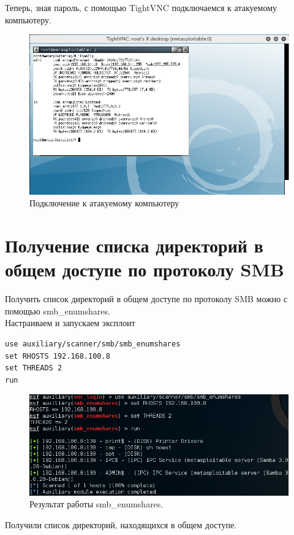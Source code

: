 \documentclass[10pt,a4paper]{report}
\begin{document}
Теперь, зная пароль, с помощью TightVNC подключаемся к атакуемому компьютеру.
\begin{figure}[h!]
	\centering
	\includegraphics[width=\textwidth]{Img/7}
	\caption{Подключение к атакуемому компьютеру}
	\label{Img:7}
\end{figure}

\newpage
\section{Получение списка директорий в общем доступе по протоколу SMB}
Получить список директорий в общем доступе по протоколу SMB можно с помощью smb\_enumshares.\\
Настраиваем и запускаем эксплоит
\begin{verbatim}
use auxiliary/scanner/smb/smb_enumshares
set RHOSTS 192.168.100.8
set THREADS 2
run
\end{verbatim}

\begin{figure}[h!]
	\centering
	\includegraphics[width=\textwidth]{Img/8}
	\caption{Результат работы smb\_enumshares.}
\end{figure}

Получили список директорий, находящихся в общем доступе.
\end{document}
